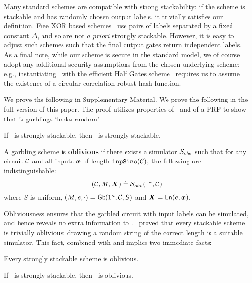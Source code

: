 Many standard schemes are compatible with strong stackability:
if the scheme is stackable and has randomly chosen output labels, it
trivially satisfies our definition.
%
Free XOR based schemes~\cite{ICALP:KolSch08} use
pairs of labels separated by a fixed constant $\Delta$, and so
are not \emph{a priori} strongly stackable. However, it is easy to adjust such
schemes such that the final output gates return independent labels.
%
As a final note, while our scheme is secure in the standard model, we
of course adopt any additional security assumptions from the chosen
underlying scheme: e.g., instantiating \ourschemelong\ with the efficient
Half Gates scheme~\cite{EC:ZahRosEva15} requires us to assume the
existence of a circular correlation robust hash function.

\iffull
We prove the following in Supplementary Material.
\else
We prove the following in the full version of this paper.
\fi
The proof
utilizes properties of \underscheme\ and of a PRF to show
that \ourschemelong's garblings `looks random'.

\begin{theorem}\label{thm:strongstack}
  If \underscheme\ is strongly stackable, then \ourschemelong\ is strongly stackable.
\end{theorem}
\begin{definition}[Obliviousness]\label{def:obliviousness}
  A garbling scheme is \textbf{oblivious} if there exists a
  simulator $\mathcal{S}_{obv}$ such that for
  any circuit $\mathcal C$
  and all inputs $\cirinp$ of length $\mathtt{inpSize}(\mathcal C)$,
  the following are indistinguishable:
  \[
    (\cir, \mat, \gcirinp) \indist \simulator_{obv}(1^\kappa, \cir)
  \]
  where
   $S$ is uniform,
   $(M, e, \cdot) = \textsf{Gb}(1^\kappa,\mathcal C,S)$
  and $\gcirinp = \gEn(e,\cirinp)$.
\end{definition}

Obliviousness ensures that the garbled circuit with input labels can be simulated, and
hence reveals no extra information to \E.
\HK\ proved that every stackable scheme is trivially oblivious:
drawing a random string of the correct length is a suitable simulator.
This fact, combined with  and
 implies two
immediate facts:
\begin{lemma}\label{lemma:obliviousness}
  Every strongly stackable scheme is oblivious.
\end{lemma}
\begin{theorem}\label{thm:oblivious}
  If \underscheme\ is strongly stackable, then \ourschemelong\ is oblivious.
\end{theorem}

